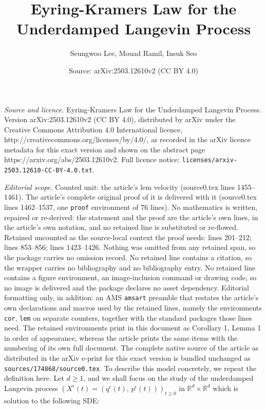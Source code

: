 \documentclass[10pt,a4paper]{amsart}
\title{Eyring-Kramers Law for the Underdamped Langevin Process}
\author{Seungwoo Lee, Mouad Ramil, Insuk Seo}
\date{Source: arXiv:2503.12610v2 (CC BY 4.0)}
\begin{document}
\maketitle

\noindent\emph{Source and licence.} Eyring-Kramers Law for the Underdamped Langevin Process. Version arXiv:2503.12610v2 (CC BY 4.0), distributed by arXiv under the Creative Commons Attribution 4.0 International licence, http://creativecommons.org/licenses/by/4.0/, as recorded in the arXiv licence metadata for this exact version and shown on the abstract page https://arxiv.org/abs/2503.12610v2. Full licence notice: \texttt{licenses/arxiv-2503.12610-CC-BY-4.0.txt}.\par\smallskip

\noindent\textit{Editorial scope.} Counted unit: the article's lem velocity (source0.tex lines 1455--1461). The article's complete original proof of it is delivered with it (source0.tex lines 1462--1537, one \texttt{proof} environment of 76 lines). No mathematics is written, repaired or re-derived: the statement and the proof are the article's own lines, in the article's own notation, and no retained line is substituted or re-flowed.  Retained uncounted as the source-local context the proof needs: lines 201--212; lines 853--856; lines 1423--1426.  Nothing was omitted from any retained span, so the package carries no omission record.  No retained line contains a citation, so the wrapper carries no bibliography and no bibliography entry.  No retained line contains a figure environment, an image-inclusion command or drawing code, so no image is delivered and the package declares no asset dependency.  Editorial formatting only, in addition: an AMS \texttt{amsart} preamble that restates the article's own declarations and macros used by the retained lines, namely the environments \texttt{cor}, \texttt{lem} on separate counters, together with the standard packages those lines need.  The retained environments print in this document as Corollary 1, Lemma 1 in order of appearance, whereas the article prints the same items with the numbering of its own full document.  The complete native source of the article as distributed in the arXiv e-print for this exact version is bundled unchanged as \texttt{sources/174868/source0.tex}.
To describe this model concretely, we repeat the definition here. Let $d\geq1$, and we shall focus on the study of the underdamped Langevin process $(X^{\epsilon}(t)=(q^{\epsilon}(t),\,p^{\epsilon}(t)))_{t\geq0}$
in $\mathbb{R}^{d}\times\mathbb{R}^{d}$ which is solution to the following SDE: 
\end{document}
